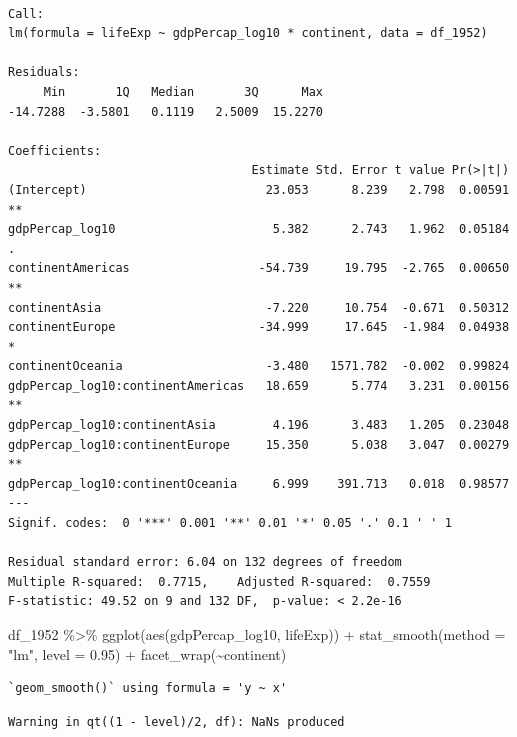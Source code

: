 \documentclass[
  letterpaper,
  DIV=11,
  numbers=noendperiod]{scrartcl}
\newenvironment{Shaded}{\begin{snugshade}}{\end{snugshade}}
\newcommand{\AttributeTok}[1]{\textcolor[rgb]{0.40,0.45,0.13}{#1}}
\newcommand{\FloatTok}[1]{\textcolor[rgb]{0.68,0.00,0.00}{#1}}
\newcommand{\FunctionTok}[1]{\textcolor[rgb]{0.28,0.35,0.67}{#1}}
\newcommand{\NormalTok}[1]{\textcolor[rgb]{0.00,0.23,0.31}{#1}}
\newcommand{\SpecialCharTok}[1]{\textcolor[rgb]{0.37,0.37,0.37}{#1}}
\newcommand{\StringTok}[1]{\textcolor[rgb]{0.13,0.47,0.30}{#1}}
\begin{document}
\begin{verbatim}

Call:
lm(formula = lifeExp ~ gdpPercap_log10 * continent, data = df_1952)

Residuals:
     Min       1Q   Median       3Q      Max 
-14.7288  -3.5801   0.1119   2.5009  15.2270 

Coefficients:
                                  Estimate Std. Error t value Pr(>|t|)   
(Intercept)                         23.053      8.239   2.798  0.00591 **
gdpPercap_log10                      5.382      2.743   1.962  0.05184 . 
continentAmericas                  -54.739     19.795  -2.765  0.00650 **
continentAsia                       -7.220     10.754  -0.671  0.50312   
continentEurope                    -34.999     17.645  -1.984  0.04938 * 
continentOceania                    -3.480   1571.782  -0.002  0.99824   
gdpPercap_log10:continentAmericas   18.659      5.774   3.231  0.00156 **
gdpPercap_log10:continentAsia        4.196      3.483   1.205  0.23048   
gdpPercap_log10:continentEurope     15.350      5.038   3.047  0.00279 **
gdpPercap_log10:continentOceania     6.999    391.713   0.018  0.98577   
---
Signif. codes:  0 '***' 0.001 '**' 0.01 '*' 0.05 '.' 0.1 ' ' 1

Residual standard error: 6.04 on 132 degrees of freedom
Multiple R-squared:  0.7715,    Adjusted R-squared:  0.7559 
F-statistic: 49.52 on 9 and 132 DF,  p-value: < 2.2e-16
\end{verbatim}

\begin{Shaded}
\begin{Highlighting}[]
\NormalTok{df\_1952 }\SpecialCharTok{\%\textgreater{}\%}
  \FunctionTok{ggplot}\NormalTok{(}\FunctionTok{aes}\NormalTok{(gdpPercap\_log10, lifeExp)) }\SpecialCharTok{+} 
  \FunctionTok{stat\_smooth}\NormalTok{(}\AttributeTok{method =} \StringTok{"lm"}\NormalTok{, }\AttributeTok{level =} \FloatTok{0.95}\NormalTok{) }\SpecialCharTok{+} 
  \FunctionTok{facet\_wrap}\NormalTok{(}\SpecialCharTok{\textasciitilde{}}\NormalTok{continent)}
\end{Highlighting}
\end{Shaded}

\begin{verbatim}
`geom_smooth()` using formula = 'y ~ x'
\end{verbatim}

\begin{verbatim}
Warning in qt((1 - level)/2, df): NaNs produced
\end{verbatim}
\end{document}
